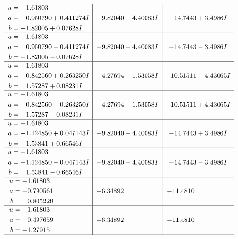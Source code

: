 \documentclass[1p]{elsarticle_modified}
\theoremstyle{definition}
\begin{document}
$$\begin{array}{c|c|c}
\begin{aligned}
u &= -1.61803\phantom{ +0.000000I} \\
a &= \phantom{-}0.950790 + 0.411274 I \\
b &= -1.82005 + 0.07628 I\end{aligned}
 & -9.82040 - 4.40083 I & -14.7443 + 3.4986 I \\ \hline\begin{aligned}
u &= -1.61803\phantom{ +0.000000I} \\
a &= \phantom{-}0.950790 - 0.411274 I \\
b &= -1.82005 - 0.07628 I\end{aligned}
 & -9.82040 + 4.40083 I & -14.7443 - 3.4986 I \\ \hline\begin{aligned}
u &= -1.61803\phantom{ +0.000000I} \\
a &= -0.842560 + 0.263250 I \\
b &= \phantom{-}1.57287 + 0.08231 I\end{aligned}
 & -4.27694 + 1.53058 I & -10.51511 - 4.43065 I \\ \hline\begin{aligned}
u &= -1.61803\phantom{ +0.000000I} \\
a &= -0.842560 - 0.263250 I \\
b &= \phantom{-}1.57287 - 0.08231 I\end{aligned}
 & -4.27694 - 1.53058 I & -10.51511 + 4.43065 I \\ \hline\begin{aligned}
u &= -1.61803\phantom{ +0.000000I} \\
a &= -1.124850 + 0.047143 I \\
b &= \phantom{-}1.53841 + 0.66546 I\end{aligned}
 & -9.82040 - 4.40083 I & -14.7443 + 3.4986 I \\ \hline\begin{aligned}
u &= -1.61803\phantom{ +0.000000I} \\
a &= -1.124850 - 0.047143 I \\
b &= \phantom{-}1.53841 - 0.66546 I\end{aligned}
 & -9.82040 + 4.40083 I & -14.7443 - 3.4986 I \\ \hline\begin{aligned}
u &= -1.61803\phantom{ +0.000000I} \\
a &= -0.790561\phantom{ +0.000000I} \\
b &= \phantom{-}0.805229\phantom{ +0.000000I}\end{aligned}
 & -6.34892\phantom{ +0.000000I} & -11.4810\phantom{ +0.000000I} \\ \hline\begin{aligned}
u &= -1.61803\phantom{ +0.000000I} \\
a &= \phantom{-}0.497659\phantom{ +0.000000I} \\
b &= -1.27915\phantom{ +0.000000I}\end{aligned}
 & -6.34892\phantom{ +0.000000I} & -11.4810\phantom{ +0.000000I}\\
 \hline 
 \end{array}$$\newpage
\end{document}
